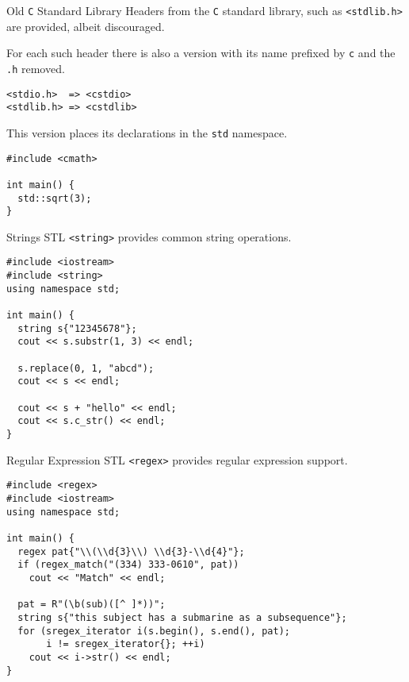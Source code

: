 \documentclass[presentation]{beamer}
\begin{document}
\begin{frame}[fragile,label={sec:orgheadline62}]{Old \texttt{C} Standard Library}
 Headers from the \texttt{C} standard library, such as \texttt{<stdlib.h>} are
provided, albeit discouraged.

For each such header there is also a version with its name prefixed
by \texttt{c} and the \texttt{.h} removed.

\begin{verbatim}
<stdio.h>  => <cstdio>
<stdlib.h> => <cstdlib>
\end{verbatim}

This version places its declarations in the \texttt{std} namespace.

\begin{verbatim}
#include <cmath>

int main() {
  std::sqrt(3);
}
\end{verbatim}
\end{frame}

\begin{frame}[fragile,label={sec:orgheadline63}]{Strings}
 STL \texttt{<string>} provides common string operations.

\begin{verbatim}
#include <iostream>
#include <string>
using namespace std;

int main() {
  string s{"12345678"};
  cout << s.substr(1, 3) << endl;

  s.replace(0, 1, "abcd");
  cout << s << endl;

  cout << s + "hello" << endl;
  cout << s.c_str() << endl;
}
\end{verbatim}
\end{frame}

\begin{frame}[fragile,label={sec:orgheadline64}]{Regular Expression}
 STL \texttt{<regex>} provides regular expression support.

\begin{verbatim}
#include <regex>
#include <iostream>
using namespace std;

int main() {
  regex pat{"\\(\\d{3}\\) \\d{3}-\\d{4}"};
  if (regex_match("(334) 333-0610", pat))
    cout << "Match" << endl;

  pat = R"(\b(sub)([^ ]*))";
  string s{"this subject has a submarine as a subsequence"};
  for (sregex_iterator i(s.begin(), s.end(), pat);
       i != sregex_iterator{}; ++i)
    cout << i->str() << endl;
}
\end{verbatim}
\end{frame}
\end{document}
